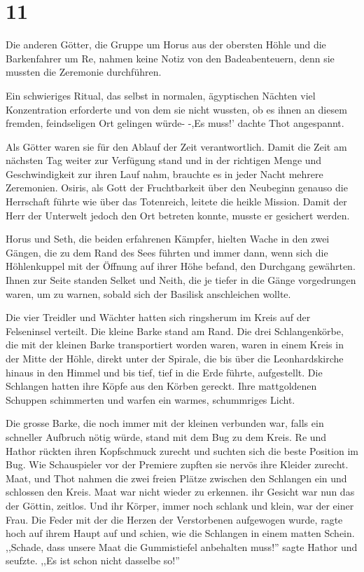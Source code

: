 \documentclass[11pt,titlepage,a5paper]{book}
\begin{document}
\section*{11}

Die anderen Götter, die Gruppe um Horus aus der obersten Höhle und die Barkenfahrer um Re, nahmen keine Notiz von den Badeabenteuern, denn sie mussten die Zeremonie durchführen.

Ein schwieriges Ritual, das selbst in normalen, ägyptischen Nächten viel Konzentration erforderte und von dem sie nicht wussten, ob es ihnen an diesem fremden, feindseligen Ort gelingen würde- -,Es muss!' dachte Thot angespannt. 

Als Götter waren sie für den Ablauf der Zeit verantwortlich. Damit die Zeit am nächsten Tag weiter zur Verfügung stand und in der richtigen Menge und Geschwindigkeit zur ihren Lauf nahm, brauchte es in jeder Nacht mehrere Zeremonien. Osiris, als Gott der Fruchtbarkeit über den Neubeginn genauso die Herrschaft führte wie über das Totenreich, leitete die heikle Mission. Damit der Herr der Unterwelt jedoch den Ort betreten konnte, musste er gesichert werden.

Horus und Seth, die beiden erfahrenen Kämpfer, hielten Wache in den zwei Gängen, die zu dem Rand des Sees führten und immer dann, wenn sich die Höhlenkuppel mit der Öffnung auf ihrer Höhe befand, den Durchgang gewährten. Ihnen zur Seite standen Selket und Neith, die je tiefer in die Gänge vorgedrungen waren, um zu warnen, sobald sich der Basilisk anschleichen wollte.

Die vier Treidler und Wächter hatten sich ringsherum im Kreis auf der Felseninsel verteilt. Die kleine Barke stand am Rand. Die drei Schlangenkörbe, die mit der kleinen Barke transportiert worden waren, waren in einem Kreis in der Mitte der Höhle, direkt unter der Spirale, die bis über die Leonhardskirche hinaus in den Himmel und bis tief, tief in die Erde führte, aufgestellt. Die Schlangen hatten ihre Köpfe aus den Körben gereckt. Ihre mattgoldenen Schuppen schimmerten und warfen ein warmes, schummriges Licht. 

Die grosse Barke, die noch immer mit der kleinen verbunden war, falls ein schneller Aufbruch nötig würde, stand mit dem Bug zu dem Kreis. Re und Hathor rückten ihren Kopfschmuck zurecht und suchten sich die beste Position im Bug. Wie Schauspieler vor der Premiere zupften sie nervös ihre Kleider zurecht. Maat, und Thot nahmen die zwei freien Plätze zwischen den Schlangen ein und schlossen den Kreis. Maat war nicht wieder zu erkennen. ihr Gesicht war nun das der Göttin, zeitlos. Und ihr Körper, immer noch schlank und klein, war der einer Frau. Die Feder mit der die Herzen der Verstorbenen aufgewogen wurde, ragte hoch auf ihrem Haupt auf und schien, wie die Schlangen in einem matten Schein. ,,Schade, dass unsere Maat die Gummistiefel anbehalten muss!'' sagte Hathor und seufzte. ,,Es ist schon nicht dasselbe so!''
\end{document}
